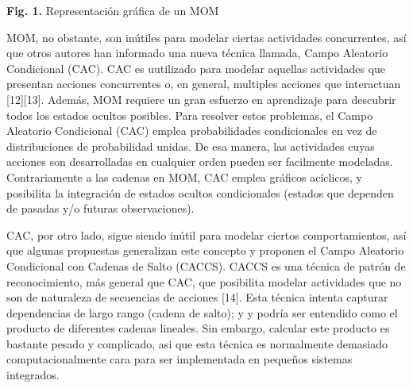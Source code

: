 \documentclass[a4paper]{article}
\begin{document}
\begin{center}\textbf{Fig. 1.} Representación gráfica de un MOM\end{center}
        \begin{center}
                MOM, no obstante, son inútiles para modelar ciertas actividades concurrentes, así que otros autores han informado una nueva técnica llamada, Campo Aleatorio Condicional (CAC). CAC es uutilizado para modelar aquellas actividades que presentan acciones concurrentes o, en general, multiples acciones que interactuan [12][13]. Además, MOM requiere un gran esfuerzo en aprendizaje para descubrir todos los estados ocultos posibles. Para resolver estos problemas, el Campo Aleatorio Condicional (CAC) emplea probabilidades condicionales en vez de distribuciones de probabilidad unidas. De esa manera, las actividades cuyas acciones son desarrolladas en cualquier orden pueden ser facilmente modeladas. Contrariamente a las cadenas en MOM, CAC emplea gráficos acíclicos, y posibilita la integración de estados ocultos condicionales (estados que dependen de pasadas y/o futuras observaciones).
                \end{center}
\begin{center}
    
CAC, por otro lado, sigue siendo inútil para modelar ciertos comportamientos, así que algunas propuestas generalizan este concepto y proponen el Campo Aleatorio Condicional con Cadenas de Salto
(CACCS). CACCS es una técnica de patrón de reconocimiento, más general que CAC, que posibilita modelar actividades que no son de naturaleza de secuencias de acciones [14]. Esta técnica intenta capturar dependencias de largo rango (cadena de salto); y y podría ser entendido como el producto de diferentes cadenas lineales. Sin embargo, calcular este producto es bastante pesado y complicado, asi que esta técnica es normalmente demasiado computacionalmente cara para ser implementada en pequeños sistemas integrados.
\end{center}
\end{document}
